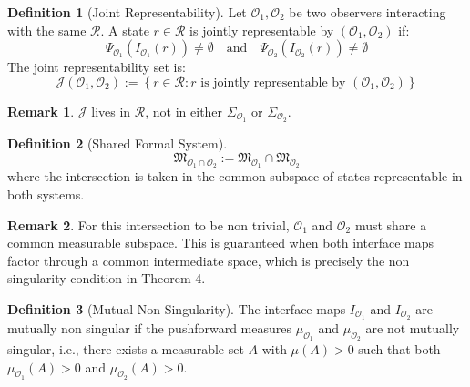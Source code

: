 \documentclass[12pt]{article}
\theoremstyle{definition}
\newtheorem{definition}{Definition}
\newtheorem{remark}{Remark}
\begin{document}
\begin{definition}[Joint Representability]
Let $\mathcal{O}_1, \mathcal{O}_2$ be two observers interacting with the same $\mathcal{R}$. A state $r \in \mathcal{R}$ is jointly representable by $(\mathcal{O}_1, \mathcal{O}_2)$ if:
\begin{equation}
\Psi_{\mathcal{O}_1}(I_{\mathcal{O}_1}(r)) \neq \emptyset \quad \text{and} \quad \Psi_{\mathcal{O}_2}(I_{\mathcal{O}_2}(r)) \neq \emptyset
\end{equation}
The joint representability set is:
\begin{equation}
\mathcal{J}(\mathcal{O}_1, \mathcal{O}_2) := \left\{ r \in \mathcal{R} : r \text{ is jointly representable by } (\mathcal{O}_1, \mathcal{O}_2) \right\}
\end{equation}
\end{definition}

\begin{remark}
$\mathcal{J}$ lives in $\mathcal{R}$, not in either $\Sigma_{\mathcal{O}_1}$ or $\Sigma_{\mathcal{O}_2}$.
\end{remark}

\begin{definition}[Shared Formal System]
\begin{equation}
\mathfrak{M}_{\mathcal{O}_1 \cap \mathcal{O}_2} := \mathfrak{M}_{\mathcal{O}_1} \cap \mathfrak{M}_{\mathcal{O}_2}
\end{equation}
where the intersection is taken in the common subspace of states representable in both systems.
\end{definition}

\begin{remark}
For this intersection to be non trivial, $\mathcal{O}_1$ and $\mathcal{O}_2$ must share a common measurable subspace. This is guaranteed when both interface maps factor through a common intermediate space, which is precisely the non singularity condition in Theorem 4.
\end{remark}

\begin{definition}[Mutual Non Singularity]
The interface maps $I_{\mathcal{O}_1}$ and $I_{\mathcal{O}_2}$ are mutually non singular if the pushforward measures $\mu_{\mathcal{O}_1}$ and $\mu_{\mathcal{O}_2}$ are not mutually singular, i.e., there exists a measurable set $A$ with $\mu(A) > 0$ such that both $\mu_{\mathcal{O}_1}(A) > 0$ and $\mu_{\mathcal{O}_2}(A) > 0$.
\end{definition}
\end{document}
